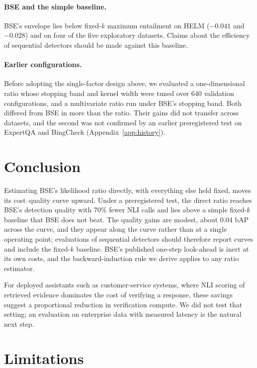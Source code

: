 \documentclass[11pt]{article}
\begin{document}
\paragraph{BSE and the simple baseline.} BSE's envelope lies below fixed-$k$
maximum entailment on HELM ($-0.041$ and $-0.028$) and on four of the five
exploratory datasets. Claims about the efficiency of sequential detectors
should be made against this baseline.

\paragraph{Earlier configurations.} Before adopting the single-factor design
above, we evaluated a one-dimensional ratio whose stopping band and kernel
width were tuned over 640 validation configurations, and a multivariate ratio
run under BSE's stopping band. Both differed from BSE in more than the ratio.
Their gains did not transfer across datasets, and the second was not
confirmed by an earlier preregistered test on ExpertQA and BingCheck
(Appendix~\ref{app:history}).

\section{Conclusion}

Estimating BSE's likelihood ratio directly, with everything else held fixed,
moves its cost--quality curve upward. Under a preregistered test, the direct
ratio reaches BSE's detection quality with 70\% fewer NLI calls and lies above
a simple fixed-$k$ baseline that BSE does not beat. The quality gains are
modest, about 0.04 bAP across the curve, and they appear along the curve
rather than at a single operating point; evaluations of sequential detectors
should therefore report curves and include the fixed-$k$ baseline. BSE's
published one-step look-ahead is inert at its own costs, and the
backward-induction rule we derive applies to any ratio estimator.

For deployed assistants such as customer-service systems, where NLI scoring of
retrieved evidence dominates the cost of verifying a response, these savings
suggest a proportional reduction in verification compute. We did not test
that setting; an evaluation on enterprise data with measured latency is the
natural next step.

\section*{Limitations}
\end{document}
